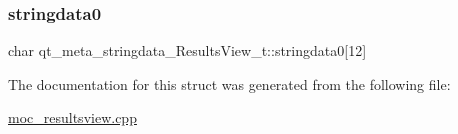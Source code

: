 \subsubsection{\texorpdfstring{stringdata0}{stringdata0}}
{\footnotesize\ttfamily char qt\+\_\+meta\+\_\+stringdata\+\_\+\+Results\+View\+\_\+t\+::stringdata0\mbox{[}12\mbox{]}}



The documentation for this struct was generated from the following file\+:\begin{DoxyCompactItemize}
\item 
\hyperlink{moc__resultsview_8cpp}{moc\+\_\+resultsview.\+cpp}\end{DoxyCompactItemize}
